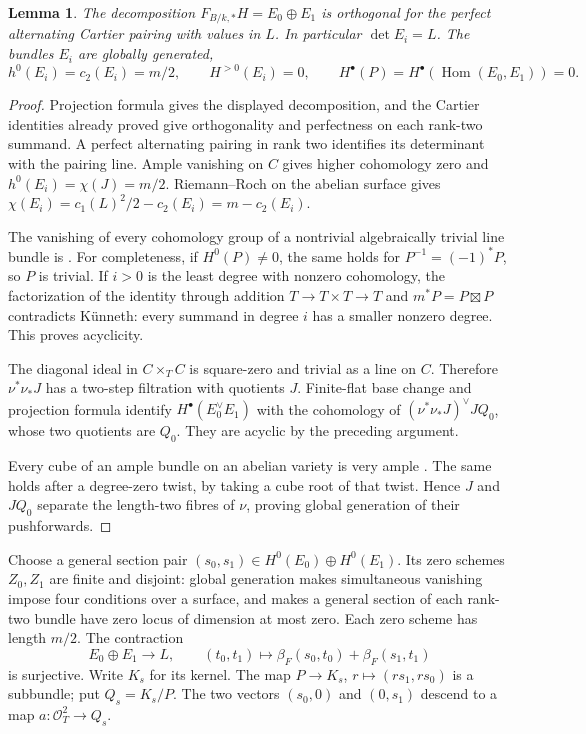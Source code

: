 \documentclass[11pt]{article}
\newtheorem{lemma}[theorem]{Lemma}
\theoremstyle{definition}\newtheorem{definition}[theorem]{Definition}
\theoremstyle{remark}\newtheorem{remark}[theorem]{Remark}
\newcommand{\OO}{\mathcal O}
\begin{document}
\begin{lemma}\label{lem:two-bundles}
The decomposition $F_{B/k,*}H=E_0\oplus E_1$ is orthogonal for the perfect alternating Cartier pairing with values in $L$. In particular $\det E_i=L$. The bundles $E_i$ are globally generated,
\[
 h^0(E_i)=c_2(E_i)=m/2,\qquad H^{>0}(E_i)=0,
 \qquad H^\bullet(P)=H^\bullet(\operatorname{Hom}(E_0,E_1))=0.
\]
\end{lemma}
\begin{proof}
Projection formula gives the displayed decomposition, and the Cartier identities already proved give orthogonality and perfectness on each rank-two summand. A perfect alternating pairing in rank two identifies its determinant with the pairing line. Ample vanishing on $C$ gives higher cohomology zero and $h^0(E_i)=\chi(J)=m/2$. Riemann--Roch on the abelian surface gives
$\chi(E_i)=c_1(L)^2/2-c_2(E_i)=m-c_2(E_i)$.

The vanishing of every cohomology group of a nontrivial algebraically trivial line bundle is \citet[Lemma~7.19 and proof, p.~105]{EGM}. For completeness, if $H^0(P)\ne0$, the same holds for $P^{-1}=(-1)^*P$, so $P$ is trivial. If $i>0$ is the least degree with nonzero cohomology, the factorization of the identity through addition $T\to T\times T\to T$ and $m^*P=P\boxtimes P$ contradicts K\"unneth: every summand in degree $i$ has a smaller nonzero degree. This proves acyclicity.

The diagonal ideal in $C\times_T C$ is square-zero and trivial as a line on $C$. Therefore $\nu^*\nu_*J$ has a two-step filtration with quotients $J$. Finite-flat base change and projection formula identify
$H^\bullet(E_0^\vee E_1)$ with the cohomology of
$(\nu^*\nu_*J)^\vee JQ_0$, whose two quotients are $Q_0$. They are acyclic by the preceding argument.

Every cube of an ample bundle on an abelian variety is very ample \citep[Theorem~2.2.3, p.~13]{GenestierNgo}. The same holds after a degree-zero twist, by taking a cube root of that twist. Hence $J$ and $JQ_0$ separate the length-two fibres of $\nu$, proving global generation of their pushforwards.
\end{proof}

Choose a general section pair $(s_0,s_1)\in H^0(E_0)\oplus H^0(E_1)$. Its zero schemes $Z_0,Z_1$ are finite and disjoint: global generation makes simultaneous vanishing impose four conditions over a surface, and makes a general section of each rank-two bundle have zero locus of dimension at most zero. Each zero scheme has length $m/2$. The contraction
\[
 E_0\oplus E_1\longrightarrow L,\qquad
 (t_0,t_1)\longmapsto\beta_F(s_0,t_0)+\beta_F(s_1,t_1)
\]
is surjective. Write $K_s$ for its kernel. The map
$P\to K_s$, $r\mapsto(rs_1,rs_0)$ is a subbundle; put $Q_s=K_s/P$.
The two vectors $(s_0,0)$ and $(0,s_1)$ descend to a map
$a:\OO_T^2\to Q_s$.
\end{document}
